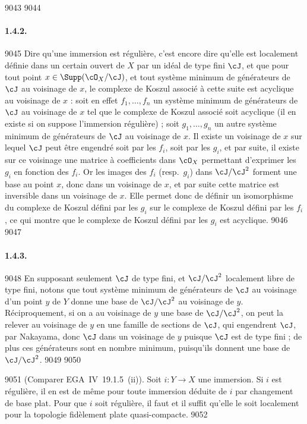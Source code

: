   9043	
  9044	\paragraph{1.4.2.}
  9045	Dire qu'une immersion est r\'eguli\`ere, c'est encore dire qu'elle est localement d\'efinie dans un certain ouvert de $X$ par un id\'eal de type fini $\cJ$, et que pour tout point $x \in \Supp(\cO_X/\cJ)$, et tout syst\`eme minimum de g\'en\'erateurs de $\cJ$ au voisinage de $x$, le complexe de Koszul associ\'e \`a cette suite est acyclique au voisinage de $x$ : soit en effet $f_1,\dots,f_n$ un syst\`eme minimum de g\'en\'erateurs de $\cJ$ au voisinage de $x$ tel que le complexe de Koszul associ\'e soit acyclique (il en existe si on suppose l'immersion r\'eguli\`ere) ; soit $g_1,\dots,g_n$ un autre syst\`eme minimum de g\'en\'erateurs de $\cJ$ au voisinage de $x$. Il existe un voisinage de $x$ sur lequel $\cJ$ peut \^etre engendr\'e soit par les $f_i$, soit par les $g_i$, et par suite, il existe sur ce voisinage une matrice \`a coefficients dans $\cO_X$ permettant d'exprimer les $g_i$ en fonction des $f_i$. Or les images des $f_i$ (resp.~$g_i$) dans $\cJ/\cJ^2$ forment une base au point $x$, donc dans un voisinage de $x$, et par suite cette matrice est inversible dans un voisinage de $x$. Elle permet donc de d\'efinir un isomorphisme du complexe de Koszul d\'efini par les $g_i$ sur le complexe de Koszul d\'efini par les $f_i$, ce qui montre que le complexe de Koszul d\'efini par les $g_i$ est acyclique.
  9046	
  9047	\paragraph{1.4.3.}
  9048	En supposant seulement $\cJ$ de type fini, et $\cJ/\cJ^2$ localement libre de type fini, notons que tout syst\`eme minimum de g\'en\'erateurs de $\cJ$ au voisinage d'un point $y$ de $Y$ donne une base de $\cJ/\cJ^2$ au voisinage de $y$. R\'eciproquement, si on a au voisinage de $y$ une base de $\cJ/\cJ^2$, on peut la relever au voisinage de $y$ en une famille de sections de $\cJ$, qui engendrent $\cJ$, par Nakayama, donc $\cJ$ dans un voisinage de $y$ puisque $\cJ$ est de type fini ; de plus ces g\'en\'erateurs sont en nombre minimum, puisqu'ils donnent une base de $\cJ/\cJ^2$.
  9049	
  9050	\begin{proposition}[1.5]
  9051	\textup{(}Comparer EGA~IV~19.1.5~(ii)\textup{)}. Soit $i: Y \to X$ une immersion. Si $i$ est r\'eguli\`ere, il en est de m\^eme pour toute immersion d\'eduite de $i$ par changement de base plat. Pour que $i$ soit r\'eguli\`ere, il faut et il suffit qu'elle le soit localement pour la topologie fid\`element plate quasi-compacte.
  9052	\end{proposition}
